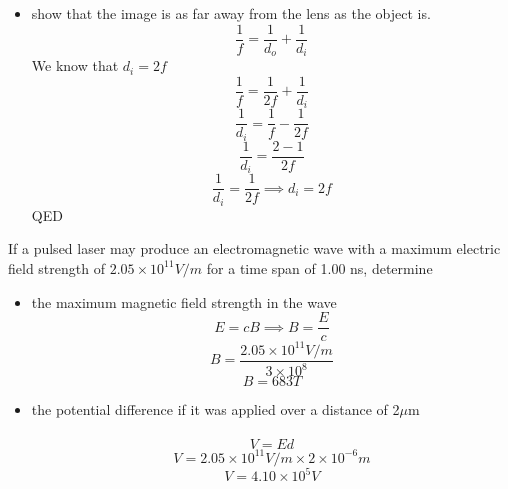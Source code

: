\documentclass[12pt,addpoints]{exam}
\begin{document}
{{{\begin{questions}
\begin{itemize}
\begin{center}
						\end{center}	
						\item show that the image is as far away from the lens as the object is.
						$$\dfrac{1}{f}=\dfrac{1}{d_o}+\dfrac{1}{d_i}$$
						We know that $d_i=2f$
						$$\dfrac{1}{f}=\dfrac{1}{2f}+\dfrac{1}{d_i}$$
						$$\dfrac{1}{d_i}=\dfrac{1}{f}-\dfrac{1}{2f}$$
						$$\dfrac{1}{d_i}=\dfrac{2-1}{2f}$$
						$$\dfrac{1}{d_i}=\dfrac{1}{2f}\implies d_i=2f$$
						QED
					\end{itemize} 
					\question If a pulsed laser may produce an electromagnetic wave with a maximum electric field strength of  $2.05\times10^{11}V/m$ for a time span of 1.00 ns, determine
					\begin{itemize}
						\item the maximum magnetic field strength in the wave \\
						$$E=cB\implies B=\dfrac{E}{c}$$
						$$B=\dfrac{2.05\times10^{11}V/m}{3\times10^8}$$
						$$B=683T$$
						\item the potential difference if it was applied over a distance of 2$\mu$m \\ \\
						$$V=Ed$$
						$$V=2.05\times10^{11}V/m\times2\times10^{-6}m$$
						$$V=4.10\times10^{5}V$$
					\end{itemize}

\end{questions}}}}
\end{document}
